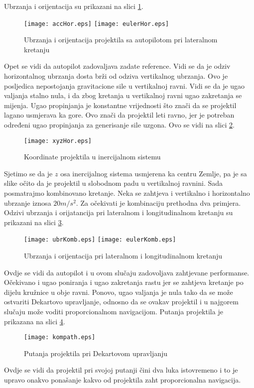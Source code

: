 Ubrzanja i orijentacija su prikazani na slici \ref{fig:horOdziv}.
\begin{figure}[!ht]
    \centering
    \texttt{[image: accHor.eps]}
    \texttt{[image: eulerHor.eps]}
    \caption{Ubrzanja i orijentacija projektila sa autopilotom pri lateralnom kretanju}
    \label{fig:horOdziv}
\end{figure}
Opet se vidi da autopilot zadovaljava zadate reference. Vidi se da je odziv horizontalnog 
ubrzanja dosta brži od odziva vertikalnog ubrzanja. Ovo je posljedica nepostojanja 
gravitacione sile u vertikalnoj ravni. Vidi se da je ugao valjanja stalno nula, i da zbog 
kretanja u vertikalnoj ravni ugao zakretanja se mijenja. Ugao propinjanja je konstantne vrijednosti što 
znači da se projektil lagano usmjerava ka gore. Ovo znači da projektil leti ravno, jer je potreban 
određeni ugao propinjanja za generisanje sile uzgona. Ovo se vidi na slici \ref{fig:horxyz}.
\begin{figure}[!ht]
    \centering 
    \texttt{[image: xyzHor.eps]}
    \caption{Koordinate projektila u inercijalnom sistemu }
    \label{fig:horxyz}
\end{figure}
Sjetimo se da je $z$ osa inercijalnog sistema usmjerena ka centru Zemlje, pa je sa slike očito da 
je projektil u slobodnom padu u vertikalnoj ravnini. 
Sada posmatrajmo kombinovano kretanje. Neka se zahtjeva i vertikalno i horizontalno 
ubrzanje iznosa $20m/s^2$. Za očekivati je kombinaciju prethodna dva primjera. 
Odzivi ubrzanja i orijatancija pri lateralnom i longitudinalnom kretanju su prikazani na slici \ref{fig:kombinovano}.
\begin{figure}[!ht]
    \centering
    \texttt{[image: ubrKomb.eps]}
    \texttt{[image: eulerKomb.eps]}
    \caption{Ubrzanja i orijentacija pri lateralnom i longitudinalnom kretanju}
    \label{fig:kombinovano}
\end{figure}
Ovdje se vidi da autopilot i u ovom slučaju zadovoljava zahtjevane performanse. Očekivano i 
ugao poniranja i ugao zakretanja rastu jer se zahtjeva kretanje po dijelu kružnice u obje ravni. 
Ponovo, ugao valjanja je nula tako da se može ostvariti Dekartovo upravljanje, odnosno da 
se ovakav projektil i u najgorem slučaju može voditi proporcionalnom navigacijom.
Putanja projektila je prikazana na slici \ref{fig:kompath}.
\begin{figure}[!ht]
    \centering
    \texttt{[image: kompath.eps]}
    \caption{Putanja projektila pri Dekartovom upravljanju}
    \label{fig:kompath}
\end{figure}
Ovdje se vidi da projektil pri svojoj putanji čini dva luka istovremeno i to je 
upravo onakvo ponašanje kakvo od projektila zaht proporcionalna navigacija. 
